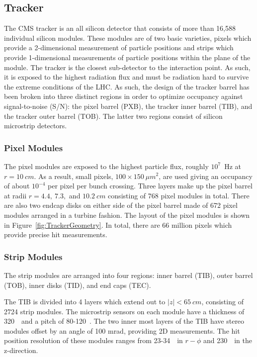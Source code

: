 \subsection{Tracker}
\label{sec:Tracker}

The CMS tracker is an all silicon detector that consists of more
than 16,588 individual silicon modules.  These modules are of two
basic varieties, pixels which provide a 2-dimensional measurement
of particle positions and strips
which provide 1-dimensional measurements of particle positions 
within the plane of the module.  The tracker
is the closest sub-detector to the interaction point.  As such, 
it is exposed to the highest radiation flux and must be radiation 
hard to survive the extreme conditions of the LHC.  As such, the 
design of the tracker barrel has been broken into three distinct 
regions in order to optimize occupancy against
signal-to-noise (S/N): the pixel barrel (PXB), the tracker inner 
barrel (TIB), and the tracker outer barrel (TOB).  The latter two 
regions consist of silicon microstrip detectors. 

\subsubsection{Pixel Modules}

The pixel modules are exposed to the highest particle flux, 
roughly $10^7$~Hz at $r=10~cm$.  As a result, small pixels, 
$100\times150~\mu m^2$, are used giving an occupancy of about 
$10^{-4}$ per pixel per bunch crossing. Three layers make up the 
pixel barrel at radii $r=4.4,~7.3,$ and $10.2~cm$ consisting of 
768 pixel modules in total.  There are also two endcap disks on
either side of the pixel barrel made of 672 pixel modules arranged
in a turbine fashion.  The layout of the pixel modules is shown in 
Figure~\ref{fig:TrackerGeometry}. In total, there are 66 million 
pixels which provide precise hit measurements.

\subsubsection{Strip Modules}

The strip modules are arranged into four regions: inner barrel 
(TIB), outer barrel (TOB), inner disks (TID), and end caps (TEC). 

The TIB is divided into 4 layers which extend out to 
$|z|<65~cm$, consisting of 2724 strip modules.  The microstrip 
sensors on each module have a thickness of 320~\microns~and a 
pitch of 80-120~\microns. The two inner most layers of the TIB 
have stereo modules offset by an angle of 100 mrad, providing 2D
measurements.  The hit position resolution of these modules ranges
from 23-34~\microns~in $r-\phi$ and 230~\microns~in the z-direction.

